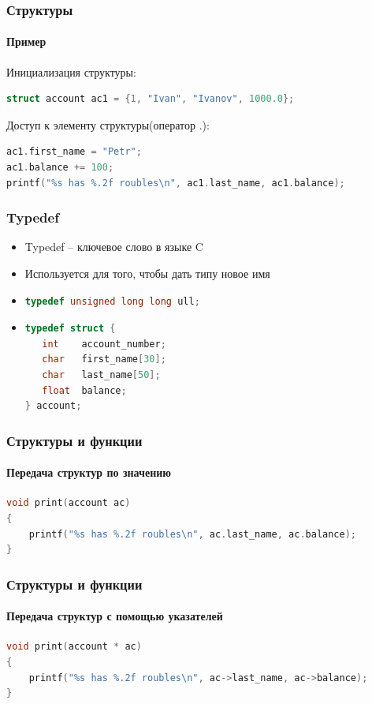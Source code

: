 \documentclass[12pt,pdf,hyperref={unicode}]{beamer}
\begin{document}
\begin{frame}[fragile]
\frametitle{Структуры} 
\framesubtitle{Пример} 
Инициализация структуры:
\begin{lstlisting}[language=C++,basicstyle=\ttfamily,keywordstyle=\color{blue}]
struct account ac1 = {1, "Ivan", "Ivanov", 1000.0};
\end{lstlisting}
Доступ к элементу структуры(оператор .):
\begin{lstlisting}[language=C++,basicstyle=\ttfamily,keywordstyle=\color{blue}]
ac1.first_name = "Petr";
ac1.balance += 100;
printf("%s has %.2f roubles\n", ac1.last_name, ac1.balance);
\end{lstlisting}
\end{frame}


\begin{frame}[fragile]
\frametitle{Typedef} 
\begin{itemize}
\item Typedef -- ключевое слово в языке C \\
\item Используется для того, чтобы дать типу новое имя \\
\item 
\begin{lstlisting}[language=C++,basicstyle=\ttfamily,keywordstyle=\color{blue}]
typedef unsigned long long ull;
\end{lstlisting}
\item 
\begin{lstlisting}[language=C++,basicstyle=\ttfamily,keywordstyle=\color{blue}]
typedef struct {
   int    account_number;
   char   first_name[30];
   char   last_name[50];
   float  balance;
} account;
\end{lstlisting}
\end{itemize}
\end{frame}

\begin{frame}[fragile]
\frametitle{Структуры и функции} 
\framesubtitle{Передача структур по значению} 

\begin{lstlisting}[language=C++,basicstyle=\ttfamily,keywordstyle=\color{blue}]
void print(account ac)
{
    printf("%s has %.2f roubles\n", ac.last_name, ac.balance);
}
\end{lstlisting}
\end{frame}



\begin{frame}[fragile]
\frametitle{Структуры и функции} 
\framesubtitle{Передача структур с помощью указателей} 

\begin{lstlisting}[language=C++,basicstyle=\ttfamily,keywordstyle=\color{blue}]
void print(account * ac)
{
    printf("%s has %.2f roubles\n", ac->last_name, ac->balance);
}
\end{lstlisting}
\end{frame}
\end{document}
